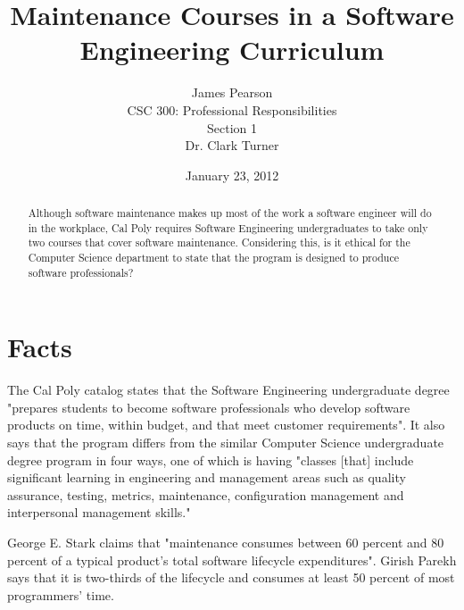 \documentclass[12pt]{article}
\begin{document}
\title{\vfill Maintenance Courses in a Software Engineering Curriculum} %
\author{
James Pearson \vspace{10pt} \\
CSC 300: Professional Responsibilities  \vspace{10pt} \\
Section 1 \vspace{10pt} \\
Dr. Clark Turner \vspace{10pt} \\
}
\date{January 23, 2012} %

\maketitle

\vfill  %
\begin{abstract}
Although software maintenance makes up most of the work a software engineer will do in the workplace, Cal Poly requires Software Engineering undergraduates to take only two courses that cover software maintenance.  Considering this, is it ethical for the Computer Science department to state that the program is designed to produce software professionals?
\end{abstract}

\thispagestyle{empty} %
\newpage

\section{Facts}
The Cal Poly catalog states that the Software Engineering undergraduate degree "prepares students to become software professionals who develop software 
products on time, within budget, and that meet customer requirements". \cite{catalogDept}  It also says that the program differs from the similar Computer Science undergraduate degree program in four ways, one of which is having "classes [that] include significant learning in engineering and management areas such as quality assurance, testing, metrics, maintenance, configuration management and interpersonal management skills." \cite{catalogDept}

George E. Stark claims that "maintenance consumes between 60 percent and 80 percent of a typical product's total software lifecycle expenditures". \cite{stark97}  Girish Parekh says that it is two-thirds of the lifecycle and consumes at least 50 percent of most programmers' time. \cite{parekh}
\end{document}
